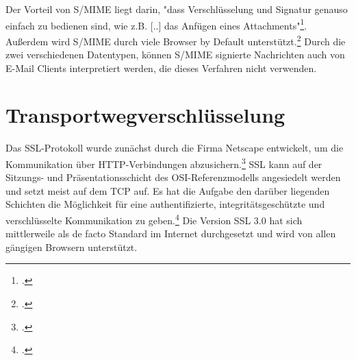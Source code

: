 \documentclass  [paper=a4,
				fontsize=12pt,
				listof=totoc,
				bibliography=totoc
				]{scrreprt}
\begin{document}
				
										
				Der Vorteil von \ac{S/MIME} liegt darin, "dass Verschlüsselung und Signatur genauso einfach zu bedienen sind, wie z.B. [..] das Anfügen eines Attachments"\footcite[Vgl.][S. 61]{Schwenk}. Außerdem wird \ac{S/MIME} durch viele Browser by Default unterstützt.\footcite[Vgl.][]{Duevel}
				Durch die zwei verschiedenen Datentypen, können \ac{S/MIME} signierte Nachrichten auch von E-Mail Clients interpretiert werden, die dieses Verfahren nicht verwenden. 
				\newpage
				
				
		\section{Transportwegverschlüsselung}
			Das \ac{SSL}-Protokoll wurde zunächst durch die Firma Netscape entwickelt, um die Kommunikation über \ac{HTTP}-Verbindungen abzusichern.\footcite[Vgl.][S. 796]{Eckert2013} \ac{SSL} kann auf der Sitzungs- und Präsentationsschicht des \ac{OSI}-Referenzmodells angesiedelt werden und setzt meist auf dem \ac{TCP} auf. Es hat die Aufgabe den darüber liegenden Schichten die Möglichkeit für eine authentifizierte, integritätsgeschützte und verschlüsselte Kommunikation zu geben.\footcite[Vgl.][S. 799 ff.]{Eckert2013}
			Die Version \ac{SSL} 3.0 hat sich mittlerweile als de facto Standard im Internet durchgesetzt und wird von allen gängigen Browsern unterstützt.\\
		
\end{document}
